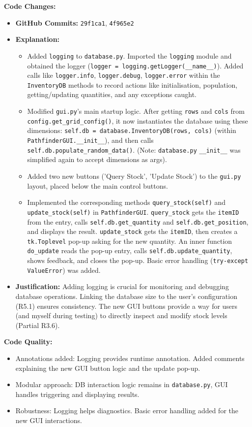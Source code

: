 \textbf{Code Changes:}
\begin{itemize}
	\item \textbf{GitHub Commits:} \verb|29f1ca1|, \verb|4f965e2|
	\item \textbf{Explanation:}
	\begin{itemize}
		\item Added \verb|logging| to \verb|database.py|. Imported the \verb|logging| module and obtained the logger (\verb|logger = logging.getLogger(__name__)|). Added calls like \verb|logger.info|, \verb|logger.debug|, \verb|logger.error| within the \verb|InventoryDB| methods to record actions like initialisation, population, getting/updating quantities, and any exceptions caught.
		\item Modified \verb|gui.py|'s main startup logic. After getting \verb|rows| and \verb|cols| from \verb|config.get_grid_config()|, it now instantiates the database using these dimensions: \verb|self.db = database.InventoryDB(rows, cols)| (within \verb|PathfinderGUI.__init__|), and then calls \verb|self.db.populate_random_data()|. (Note: \verb|database.py| \verb|__init__| was simplified again to accept dimensions as args).
		\item Added two new buttons ('Query Stock', 'Update Stock') to the \verb|gui.py| layout, placed below the main control buttons.
		\item Implemented the corresponding methods \verb|query_stock(self)| and \verb|update_stock(self)| in \verb|PathfinderGUI|. \verb|query_stock| gets the \verb|itemID| from the entry, calls \verb|self.db.get_quantity| and \verb|self.db.get_position|, and displays the result. \verb|update_stock| gets the \verb|itemID|, then creates a \verb|tk.Toplevel| pop-up asking for the new quantity. An inner function \verb|do_update| reads the pop-up entry, calls \verb|self.db.update_quantity|, shows feedback, and closes the pop-up. Basic error handling (\verb|try-except ValueError|) was added.
	\end{itemize}
	\item \textbf{Justification:} Adding logging is crucial for monitoring and debugging database operations. Linking the database size to the user's configuration (R5.1) ensures consistency. The new GUI buttons provide a way for users (and myself during testing) to directly inspect and modify stock levels (Partial R3.6).
\end{itemize}

\textbf{Code Quality:}
\begin{itemize}
	\item Annotations added: Logging provides runtime annotation. Added comments explaining the new GUI button logic and the update pop-up.
	\item Modular approach: DB interaction logic remains in \verb|database.py|, GUI handles triggering and displaying results.
	\item Robustness: Logging helps diagnostics. Basic error handling added for the new GUI interactions.
\end{itemize}

